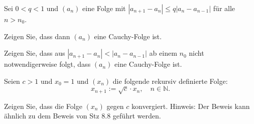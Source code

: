 \documentclass{../problemset}
\begin{document}
\pagebreak

\begin{problem}
Sei $0 < q < 1$ und $(a_n)$ eine Folge mit $|a_{n+1} - a_n| \leq q |a_n - a_{n-1}|$ für alle $n > n_0$.

\item Zeigen Sie, dass dann $(a_n)$ eine Cauchy-Folge ist.

\item Zeigen Sie, dass aus $|a_{n+1} - a_n| < |a_n - a_{n-1}|$ ab einem $n_0$ nicht notwendigerweise folgt, dass $(a_n)$ eine Cauchy-Folge ist.
\end{problem}

\pagebreak

\begin{problem}
Seien $c > 1$ und $x_0 = 1$ und $(x_n)$ die folgende rekursiv definierte Folge:
\[
	x_{n+1} := \sqrt{c} \cdot x_n, \quad n \in \mathbb{N}.
\]

Zeigen Sie, dass die Folge $(x_n)$ gegen $c$ konvergiert. Hinweis: Der Beweis kann ähnlich zu dem Beweis von Stz 8.8 geführt werden.
\end{problem}

\pagebreak
\end{document}
